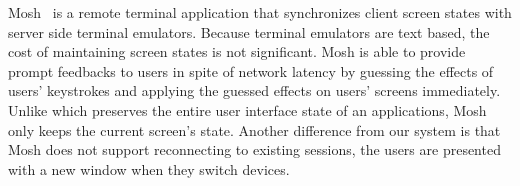 Mosh~\cite{winstein2012mosh} is a remote terminal application  that
synchronizes client screen states with server side terminal emulators.
Because terminal emulators are text based, the cost of maintaining screen
states is not significant. Mosh is able to provide prompt feedbacks to users
in spite of network latency by guessing the effects of users' keystrokes and
applying the guessed effects on users' screens immediately. Unlike \cb which
preserves the entire user interface state of an applications, Mosh only keeps the
current screen's state. Another difference
from our system is that Mosh does not support reconnecting to existing
sessions, the users are presented with a new window when they switch devices.

